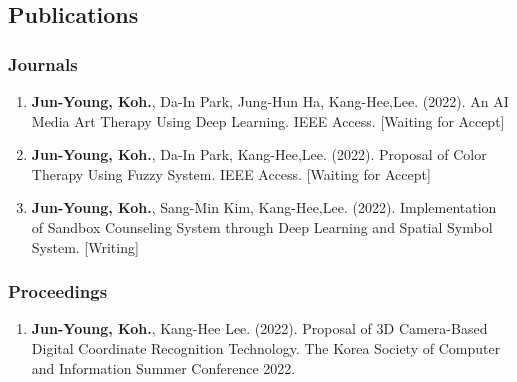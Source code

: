 \documentclass[12pt,]{scrartcl}
\begin{document}
\subsection{Publications}\label{publications}
\subsubsection{Journals}\label{journals}

\begin{enumerate}
  \leftskip-0.13in %
  \item \textbf{Jun-Young, Koh.}, Da-In Park, Jung-Hun Ha, Kang-Hee,Lee. (2022). An AI Media Art Therapy Using Deep Learning. IEEE Access. [Waiting for Accept]
  \item \textbf{Jun-Young, Koh.}, Da-In Park, Kang-Hee,Lee. (2022). Proposal of Color Therapy Using Fuzzy System. IEEE Access. [Waiting for Accept]
  \item \textbf{Jun-Young, Koh.}, Sang-Min Kim, Kang-Hee,Lee. (2022). Implementation of Sandbox Counseling System through Deep Learning and Spatial Symbol System. [Writing]
\end{enumerate}

\subsubsection{Proceedings}\label{proceedings} %

\begin{enumerate}
  \leftskip-0.13in %
  \item \textbf{Jun-Young, Koh.}, Kang-Hee Lee. (2022). Proposal of 3D Camera-Based Digital Coordinate
  Recognition Technology. The  Korea Society of Computer and Information Summer Conference 2022. %


\end{enumerate}
\end{document}
